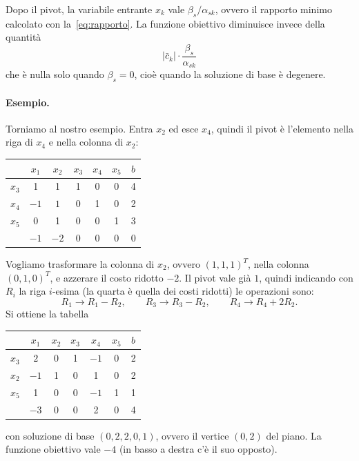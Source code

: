 \begin{osservazione}
Dopo il pivot, la variabile entrante $x_k$ vale $\beta_s / \alpha_{sk}$, ovvero il rapporto minimo calcolato con la~\eqref{eq:rapporto}. La funzione obiettivo diminuisce invece della quantità
\[
|\bar{c}_k| \cdot \frac{\beta_s}{\alpha_{sk}}
\]
che è nulla solo quando $\beta_s = 0$, cioè quando la soluzione di base è degenere.
\end{osservazione}

\paragraph{Esempio.}
Torniamo al nostro esempio. Entra $x_2$ ed esce $x_4$, quindi il pivot è l'elemento nella riga di $x_4$ e nella colonna di $x_2$:
\begin{center}
\begin{tabular}{c|ccccc|c}
 & $x_1$ & $x_2$ & $x_3$ & $x_4$ & $x_5$ & $b$ \\
\hline
$x_3$ & 1 & 1 & 1 & 0 & 0 & 4 \\
$x_4$ & $-1$ & $\boxed{1}$ & 0 & 1 & 0 & 2 \\
$x_5$ & 0 & 1 & 0 & 0 & 1 & 3 \\
\hline
 & $-1$ & $-2$ & 0 & 0 & 0 & 0 \\
\end{tabular}
\end{center}
Vogliamo trasformare la colonna di $x_2$, ovvero $(1, 1, 1)^T$, nella colonna $(0, 1, 0)^T$, e azzerare il costo ridotto $-2$. Il pivot vale già $1$, quindi indicando con $R_i$ la riga $i$-esima (la quarta è quella dei costi ridotti) le operazioni sono:
\[
R_1 \to R_1 - R_2, \qquad R_3 \to R_3 - R_2, \qquad R_4 \to R_4 + 2R_2.
\]
Si ottiene la tabella
\begin{center}
\begin{tabular}{c|ccccc|c}
 & $x_1$ & $x_2$ & $x_3$ & $x_4$ & $x_5$ & $b$ \\
\hline
$x_3$ & $\boxed{2}$ & 0 & 1 & $-1$ & 0 & 2 \\
$x_2$ & $-1$ & 1 & 0 & 1 & 0 & 2 \\
$x_5$ & 1 & 0 & 0 & $-1$ & 1 & 1 \\
\hline
 & $-3$ & 0 & 0 & 2 & 0 & 4 \\
\end{tabular}
\end{center}
con soluzione di base $(0, 2, 2, 0, 1)$, ovvero il vertice $(0, 2)$ del piano. La funzione obiettivo vale $-4$ (in basso a destra c'è il suo opposto).

